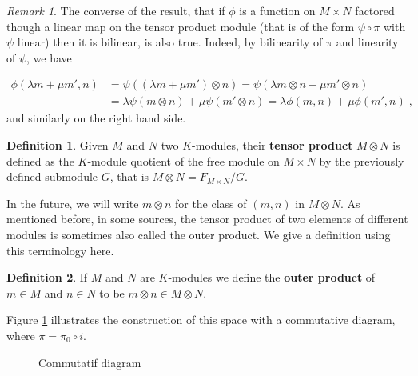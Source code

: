 \documentclass{report}
\theoremstyle{definition}
\newtheorem{defin}{Definition}
\theoremstyle{remark}
\newtheorem{remark}{Remark}
\begin{document}
\begin{remark}
 The converse of the result, that if $\phi$ is a function on $M \times N$ factored though a linear map on the tensor product module (that is of the form $\psi \circ \pi$ with $\psi$ linear) then it is bilinear, is also true. Indeed, by bilinearity of $\pi$ and linearity of $\psi$, we have
 
 
 \begin{equation*}
     \begin{split}
         \phi(\lambda m + \mu m',n) & = \psi((\lambda m + \mu m') \otimes n) = \psi(\lambda m \otimes n + \mu m' \otimes n)   \\
        & = \lambda \psi(m \otimes n) + \mu \psi(m'\otimes n) = \lambda \phi(m,n) + \mu \phi(m',n)\;,
     \end{split}
 \end{equation*} and similarly on the right hand side. 
\end{remark}


\begin{defin}
    Given $M$ and $N$ two $K$-modules, their \textbf{tensor product} $M \otimes N$ is defined as the $K$-module quotient of the free module on $M\times N$ by the previously defined submodule $G$, that is $M \otimes N = F_{M\times N}/G$.
\end{defin}
 


\bigskip
    In the future, we will write $m \otimes n$ for the class of $(m,n)$ in $M \otimes N$. 
    As mentioned before, in some sources, the tensor product of two elements of different modules is sometimes also called the outer product. We give a definition using this terminology here.  

\begin{defin}
        If $M$ and $N$ are $K$-modules we define the \textbf{outer product} of $m \in M$ and $n \in N$ to be $m \otimes n \in M \otimes N$.

\end{defin}
    
   
    
   \bigskip
    Figure \ref{fig:diagcom} illustrates the construction of this space with a commutative diagram, where $\pi = \pi_0 \circ i$. 
    
    \begin{figure}[ht!]
    
\begin{center}
\end{center}
\caption{\label{fig:diagcom}Commutatif diagram}
\end{figure}
 
\end{document}
